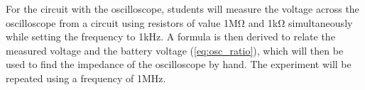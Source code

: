 For the circuit with the oscilloscope, students will measure the voltage across the oscilloscope from a circuit using resistors of value 1MΩ and 1kΩ simultaneously while setting the frequency to 1kHz. A formula is then derived to relate the measured voltage and the battery voltage (\ref{eq:osc_ratio}), which will then be used to find the impedance of the oscilloscope by hand. The experiment will be repeated using a frequency of 1MHz.
